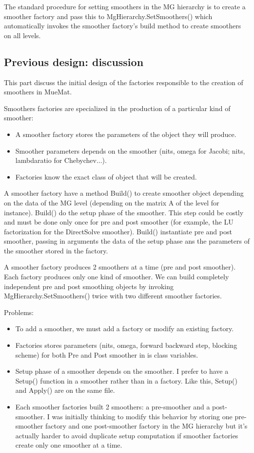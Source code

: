 The standard procedure for setting smoothers in the MG hierarchy is to
create a smoother factory and pass this to MgHierarchy.SetSmoothers()
which automatically invokes the smoother factory's build method to
create smoothers on all levels.

\subsection{Previous design: discussion}

This part discuss the initial design of the factories responsible to the creation of smoothers in MueMat.

Smoothers factories are specialized in the production of a particular kind of smoother:
\begin{itemize}
\item A smoother factory stores the parameters of the object they will produce.
\item Smoother parameters depends on the smoother (nits, omega for Jacobi; nits, lambdaratio for Chebychev...). 
\item Factories know the exact class of object that will be created.
\end{itemize}

A smoother factory have a method Build() to create smoother object
depending on the data of the MG level (depending on the matrix A of
the level for instance).  Build() do the setup phase of the
smoother. This step could be costly and must be done only once for pre
and post smoother (for example, the LU factorization for the
DirectSolve smoother). Build() instantiate pre and post smoother,
passing in arguments the data of the setup phase ans the parameters of
the smoother stored in the factory.

A smoother factory produces 2 smoothers at a time (pre and post
smoother). Each factory produces only one kind of smoother.  We can
build completely independent pre and post smoothing objects by
invoking MgHierarchy.SetSmoothers() twice with two different smoother
factories.

Problems:
\begin{itemize}
\item To add a smoother, we must add a factory or modify an existing
factory.
\item Factories stores parameters (nits, omega, forward backward step,
blocking scheme) for both Pre and Post smoother in is class variables.
\item Setup phase of a smoother depends on the smoother. I prefer to
have a Setup() function in a smoother rather than in a factory. Like
this, Setup() and Apply() are on the same file.
\item Each smoother factories built 2 smoothers: a pre-smoother and a
post-smoother.  I was initially thinking to modify this behavior by
storing one pre-smoother factory and one post-smoother factory in the
MG hierarchy but it's actually harder to avoid duplicate setup
computation if smoother factories create only one smoother at a time.
\end{itemize}

